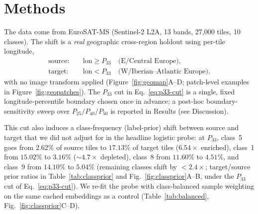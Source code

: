 \documentclass[preprint,11pt,authoryear]{elsarticle}
\begin{document}
\section{Methods}\label{sec:methods}
The data come from EuroSAT-MS \citep{helber2019eurosat} (Sentinel-2 L2A, 13 bands, 27{,}000 tiles, 10 classes). The shift is a
\emph{real} geographic cross-region holdout using per-tile longitude,
\begin{equation}
\label{eq:p33-cut}
\begin{aligned}
\mathrm{source}:&\quad \mathrm{lon}\ge P_{33}
\quad\text{(E/Central Europe)},\\
\mathrm{target}:&\quad \mathrm{lon}< P_{33}
\quad\text{(W/Iberian--Atlantic Europe)}.
\end{aligned}
\end{equation}
with no image transform applied (Figure~\ref{fig:geomap}A--D; patch-level examples in
Figure~\ref{fig:geopatches}). The $P_{33}$ cut in Eq.~\eqref{eq:p33-cut} is a single, fixed longitude-percentile
boundary chosen once in advance; a post-hoc boundary-sensitivity sweep over $P_{25}/P_{40}/P_{50}$ is
reported in Results (see Discussion).

This cut also induces a class-frequency (label-prior) shift
between source and target that we did not adjust for in the headline logistic probe: at $P_{33}$, class~5
goes from $2.62\%$ of source tiles to $17.13\%$ of target tiles ($6.54\times$ enriched), class~1 from
$15.02\%$ to $3.16\%$ ($\sim\!4.7\times$ depleted), class~8 from $11.60\%$ to $4.51\%$, and class~9 from
$14.10\%$ to $5.04\%$ (remaining classes shift by ${<}2.4\times$; target/source prior ratios in
Table~\ref{tab:classprior} and Fig.~\ref{fig:classprior}A--B, under the $P_{33}$ cut of
Eq.~\eqref{eq:p33-cut}). We
re-fit the probe with class-balanced sample weighting on the same cached embeddings as a control
(Table~\ref{tab:balanced}, Fig.~\ref{fig:classprior}C--D).
\end{document}
